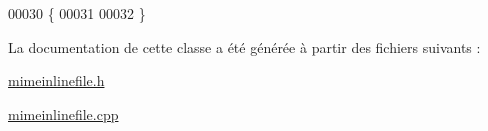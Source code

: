 \begin{DoxyCode}
00030 \{
00031 
00032 \}
\end{DoxyCode}


La documentation de cette classe a été générée à partir des fichiers suivants \+:\begin{DoxyCompactItemize}
\item 
\hyperlink{mimeinlinefile_8h}{mimeinlinefile.\+h}\item 
\hyperlink{mimeinlinefile_8cpp}{mimeinlinefile.\+cpp}\end{DoxyCompactItemize}
